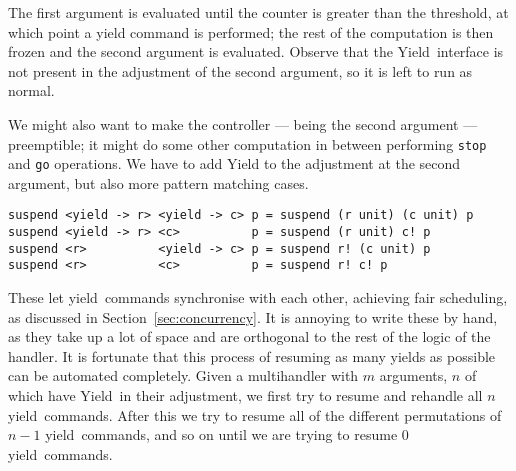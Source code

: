 \documentclass[msc,deptreport,cs]{infthesis} %
\newcommand{\code}[1]{\lstinline{#1}}
\newcommand{\texthighlight}[1]{%
  \colorbox{red!20}{#1}}
\newcommand\yield{\textsf{yield}\xspace}
\newcommand\Yield{\textsf{Yield}\xspace}
\begin{document}
The first argument is evaluated until the counter is greater than the threshold,
at which point a yield command is performed; the rest of the computation is then
frozen and the second argument is evaluated. Observe that the \Yield~interface
is not present in the adjustment of the second argument, so it is left to run
as normal.

We might also want to make the controller --- being the second argument ---
preemptible; it might do some other computation in between performing
\code{stop} and \code{go} operations. We have to add \Yield to the adjustment at
the second argument, but also more pattern matching cases.

\begin{lstlisting}[]
suspend <yield -> r> <yield -> c> p = suspend (r unit) (c unit) p
suspend <yield -> r> <c>          p = suspend (r unit) c! p
suspend <r>          <yield -> c> p = suspend r! (c unit) p
suspend <r>          <c>          p = suspend r! c! p
\end{lstlisting}
%




These let \yield~commands synchronise with each other, achieving fair
scheduling, as discussed in Section~\ref{sec:concurrency}. It is annoying to
write these by hand, as they take up a lot of space and are orthogonal to the
rest of the logic of the handler. It is fortunate that this process of resuming
as many yields as possible can be automated completely. Given a multihandler
with $m$ arguments, $n$ of which have \Yield~in their adjustment, we first try
to resume and rehandle all $n$ \yield~commands. After this we try to resume all
of the different permutations of $n-1$ \yield~commands, and so on until we are
trying to resume 0 \yield~commands.
%
\end{document}

